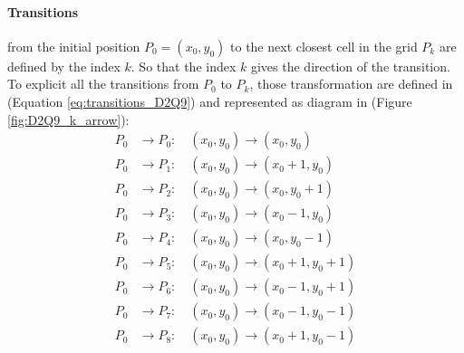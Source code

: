 \documentclass[class=article, crop=false]{standalone}
\begin{document}
\paragraph{Transitions} from the initial position $P_0=(x_0, y_0)$ to the next closest cell in the grid $P_k$ are defined by the index $k$.
So that the index $k$ gives the direction of the transition.
To explicit all the transitions from $P_0$ to $P_k$, those transformation are defined in (Equation \ref{eq:transitions_D2Q9}) and represented as diagram in (Figure \ref{fig:D2Q9_k_arrow}):
\begin{equation}
\begin{split}
P_0 &\to P_0 : \quad (x_0, y_0) \to (x_0, y_0) \\
P_0 &\to P_1 : \quad (x_0, y_0) \to (x_0+1, y_0) \\
P_0 &\to P_2 : \quad (x_0, y_0) \to (x_0, y_0+1) \\
P_0 &\to P_3 : \quad (x_0, y_0) \to (x_0-1, y_0) \\
P_0 &\to P_4 : \quad (x_0, y_0) \to (x_0, y_0-1) \\
P_0 &\to P_5 : \quad (x_0, y_0) \to (x_0+1, y_0+1) \\
P_0 &\to P_6 : \quad (x_0, y_0) \to (x_0-1, y_0+1) \\
P_0 &\to P_7 : \quad (x_0, y_0) \to (x_0-1, y_0-1) \\
P_0 &\to P_8 : \quad (x_0, y_0) \to (x_0+1, y_0-1) \\
\end{split}
\label{eq:transitions_D2Q9}
\end{equation}
\end{document}
